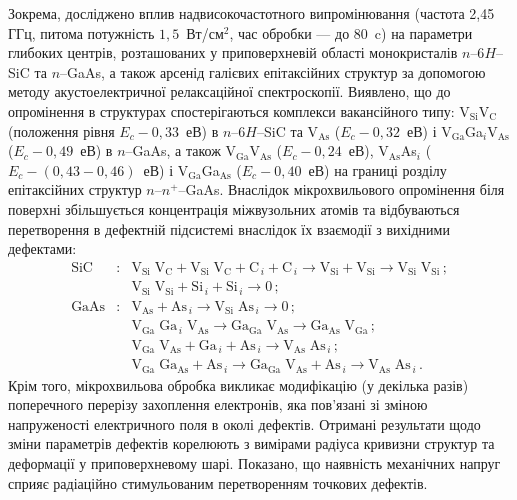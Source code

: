 Зокрема, досліджено вплив надвисокочастотного випромінювання (частота 2,45 ГГц, питома потужність  $1,5$~Вт/см$^2$, час обробки --- до 80~c) на параметри глибоких центрів, розташованих у приповерхневій області монокристалів $n$--6$H$--SiC та $n$--GaAs, а також арсенід галієвих епітаксійних структур за допомогою методу акустоелектричної релаксаційної спектроскопії.
Виявлено, що до опромінення в структурах спостерігаються комплекси вакансійного типу:
%
V$_\text{Si}$V$_\text{C}$ (положення рівня $E_c-0,33$~еВ) в $n$--6$H$--SiC
та V$_\text{As}$ ($E_c-0,32$~еВ) і V$_\text{Ga}$Ga$_i$V$_\text{As}$ ($E_c-0,49$~еВ) в $n$--GaAs,
а також V$_\text{Ga}$V$_\text{As}$ ($E_c-0,24$~еВ), V$_\text{As}$As$_i$ ($E_c-(0,43-0,46)$~еВ) і
 V$_\text{Ga}$Ga$_\text{As}$ ($E_c-0,40$~еВ) на границі розділу епітаксійних структур $n$--$n^+$--GaAs.
Внаслідок мікрохвильового опромінення біля поверхні збільшується концентрація міжвузольних атомів та відбуваються перетворення в дефектній
підсистемі внаслідок їх взаємодії з вихідними дефектами:
\begin{eqnarray*}
  \text{SiC}&:&\text{V}_\text{Si}\;\text{V}_\text{C}+\text{V}_\text{Si}\;\text{V}_\text{C}+\text{C}_{\,i}+ \text{C}_{\,i} \rightarrow \text{V}_\text{Si}+ \text{V}_\text{Si}\rightarrow \text{V}_\text{Si}\;\text{V}_\text{Si}\,;\\
  &&\text{V}_\text{Si}\;\text{V}_\text{Si}+\text{Si}_{\,i}+ \text{Si}_{\,i} \rightarrow 0\,;\\
  \text{GaAs}&:&\text{V}_\text{As}+ \text{As}_{\,i} \rightarrow\text{V}_\text{Si}\;\text{As}_{\,i} \rightarrow 0\,;\\
   &&  \text{V}_\text{Ga}\;\text{Ga}_{\,i}\;\text{V}_\text{As}\rightarrow \text{Ga}_\text{Ga}\;\text{V}_\text{As}
  \rightarrow \text{Ga}_\text{As}\;\text{V}_\text{Ga} \,;\\
  &&\text{V}_\text{Ga}\;\text{V}_\text{As}+\text{Ga}_{\,i}+\text{As}_{\,i} \rightarrow \text{V}_\text{As}\;\text{As}_{\,i}\,;\\
  &&  \text{V}_\text{Ga}\;\text{Ga}_\text{As}+\text{As}_{\,i} \rightarrow
  \text{Ga}_\text{Ga}\;\text{V}_\text{As}+\text{As}_{\,i} \rightarrow
  \text{V}_\text{As}\;\text{As}_{\,i}\,.
\end{eqnarray*}
Крім того, мікрохвильова обробка викликає модифікацію (у декілька разів) поперечного перерізу захоплення електронів,
яка пов'язані зі зміною напруженості електричного поля в околі дефектів.
Отримані результати щодо зміни параметрів дефектів корелюють з вимірами радіуса кривизни структур та деформації у приповерхневому шарі.
Показано, що наявність механічних напруг сприяє радіаційно стимульованим перетворенням точкових дефектів.


